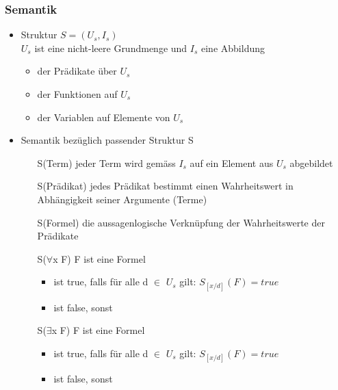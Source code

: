 \documentclass[a4paper,10pt]{article}
\begin{document}
\subsubsection{Semantik}
\begin{itemize}
	\item Struktur $S = (U_s, I_s)$ \\
		$U_s$ ist eine nicht-leere Grundmenge und $I_s$ eine Abbildung
		\begin{itemize}
			\item der Pr\"adikate \"uber $U_s$
			\item der Funktionen auf $U_s$
			\item der Variablen auf Elemente von $U_s$
		\end{itemize}
	\item Semantik bez\"uglich passender Struktur S
		\begin{itemize}
			\item[S(Term)] jeder Term wird gem\"ass $I_s$ auf ein Element aus $U_s$ abgebildet
			\item[S(Pr\"adikat)] jedes Pr\"adikat bestimmt einen Wahrheitswert in Abh\"angigkeit seiner Argumente (Terme)
			\item[S(Formel)] die aussagenlogische Verkn\"upfung der Wahrheitswerte der Pr\"adikate
			\item[S($\forall$x F)] F ist eine Formel 
				\begin{itemize}
					\item ist true, falls f\"ur alle d $\in$ $U_s$ gilt: $S_{[x/d]}(F) = true$
					\item ist false, sonst
				\end{itemize}
			\item[S($\exists$x F)] F ist eine Formel
				\begin{itemize}
					\item ist true, falls f\"ur alle d $\in$ $U_s$ gilt: $S_{[x/d]}(F) = true$
					\item ist false, sonst
				\end{itemize}
		\end{itemize}
\end{itemize}
\end{document}
